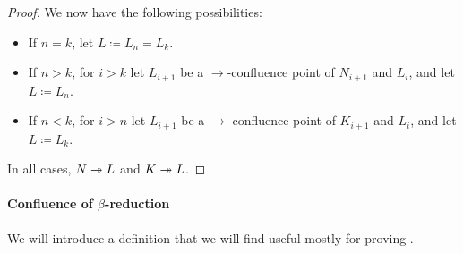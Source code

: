 \begin{proof}
  We now have the following possibilities:
  \begin{itemize}
    \item If \( n = k \), let \( L \coloneqq L_n = L_k \).
    \item If \( n > k \), for \( i > k \) let \( L_{i+1} \) be a \( {\to} \)-confluence point of \( N_{i+1} \) and \( L_i \), and let \( L \coloneqq L_n \).
    \item If \( n < k \), for \( i > n \) let \( L_{i+1} \) be a \( {\to} \)-confluence point of \( K_{i+1} \) and \( L_i \), and let \( L \coloneqq L_k \).
  \end{itemize}

  In all cases, \( N \redrel*{} L \) and \( K \redrel*{} L \).
\end{proof}

\paragraph{Confluence of \( \beta \)-reduction}\hfill

We will introduce a definition that we will find useful mostly for proving .

